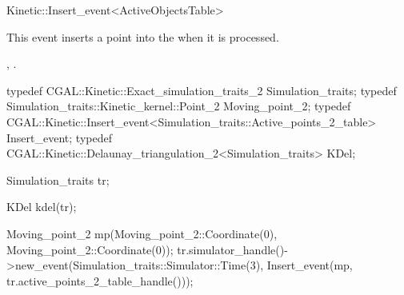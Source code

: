 

\begin{ccRefClass}{Kinetic::Insert_event<ActiveObjectsTable>}  %


\ccDefinition
  
This event inserts a point into the  when it
is processed.


\ccIsModel
{}

\ccCreation
{}  %



\ccSeeAlso

,
.

\ccExample

\begin{ccExampleCode}
typedef CGAL::Kinetic::Exact_simulation_traits_2 Simulation_traits;
typedef Simulation_traits::Kinetic_kernel::Point_2 Moving_point_2;
typedef CGAL::Kinetic::Insert_event<Simulation_traits::Active_points_2_table> Insert_event;
typedef CGAL::Kinetic::Delaunay_triangulation_2<Simulation_traits> KDel;

Simulation_traits tr;

KDel kdel(tr);

Moving_point_2 mp(Moving_point_2::Coordinate(0),
                  Moving_point_2::Coordinate(0));
tr.simulator_handle()->new_event(Simulation_traits::Simulator::Time(3), 
                                 Insert_event(mp,
			                      tr.active_points_2_table_handle()));

\end{ccExampleCode}




\end{ccRefClass}


